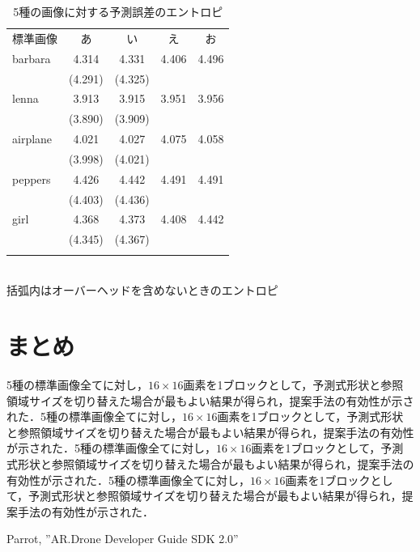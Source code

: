 \documentclass[10pt,dvipdfmx]{jsarticle}
\begin{document}
\begin{table}[t]
\begin{center}
\caption{5種の画像に対する予測誤差のエントロピ}\label{takago-paper2008080800268-tab:1}
\begin{tabular}{lcccc}
\noalign{\hrule height 1pt}
標準画像 & あ & い & え &お\\
\noalign{\hrule height 1pt} 
barbara &4.314&4.331&4.406&4.496\\
        &(4.291)&(4.325)&\\\hline
lenna   &3.913&3.915&3.951&3.956\\
        &(3.890)&(3.909)\\\hline
airplane&4.021&4.027&4.075&4.058\\
        &(3.998)&(4.021)\\\hline
peppers &4.426&4.442&4.491&4.491\\
        &(4.403)&(4.436)\\\hline
girl    &4.368&4.373&4.408&4.442\\
        &(4.345)&(4.367)\\
\noalign{\hrule height 1pt}
\end{tabular}\\
括弧内はオーバーヘッドを含めないときのエントロピ
\end{center}
\end{table}

\section{まとめ}
5種の標準画像全てに対し，$16\times 16$画素を1ブロックとして，予測式形状と参照領域サイズを切り替えた場合が最もよい結果が得られ，提案手法の有効性が示された．5種の標準画像全てに対し，$16\times 16$画素を1ブロックとして，予測式形状と参照領域サイズを切り替えた場合が最もよい結果が得られ，提案手法の有効性が示された．5種の標準画像全てに対し，$16\times 16$画素を1ブロックとして，予測式形状と参照領域サイズを切り替えた場合が最もよい結果が得られ，提案手法の有効性が示された．5種の標準画像全てに対し，$16\times 16$画素を1ブロックとして，予測式形状と参照領域サイズを切り替えた場合が最もよい結果が得られ，提案手法の有効性が示された．

\begin{thebibliography}{99}
Parrot, ''AR.Drone Developer Guide SDK 2.0''
\end{thebibliography}
\end{document}
